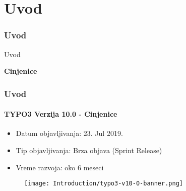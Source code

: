 %

\section{Uvod}
\begin{frame}[fragile]
	\frametitle{Uvod}

	\begin{center}\huge{Uvod}\end{center}
	\begin{center}\huge{\color{typo3darkgrey}\textbf{Cinjenice}}\end{center}

\end{frame}


\begin{frame}[fragile]
	\frametitle{Uvod}
	\framesubtitle{TYPO3 Verzija 10.0 - Cinjenice}

	\begin{itemize}
		\item Datum objavljivanja: 23. Jul 2019.
		\item Tip objavljivanja: Brza objava (Sprint Release)
		\item Vreme razvoja: oko 6 meseci
	\end{itemize}

	\begin{figure}
		\texttt{[image: Introduction/typo3-v10-0-banner.png]}
	\end{figure}

\end{frame}


